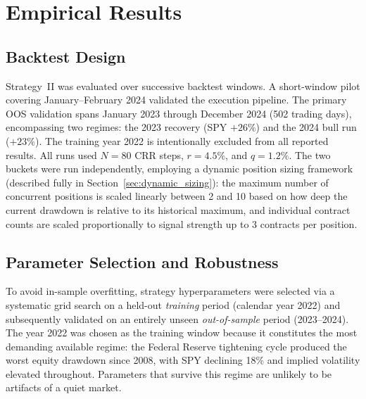 \documentclass[10pt,twocolumn]{article}
\begin{document}
\section{Empirical Results}
\label{sec:results}

\subsection{Backtest Design}

Strategy~II was evaluated over successive backtest windows. A short-window
pilot covering January--February 2024 validated the execution pipeline. The
primary OOS validation spans January 2023 through December 2024 (502 trading
days), encompassing two regimes: the 2023 recovery (SPY $+26\%$) and the
2024 bull run ($+23\%$). The training year 2022 is intentionally excluded
from all reported results.  All runs used $N = 80$ CRR steps, $r = 4.5\%$,
and $q = 1.2\%$. The two buckets were run independently, employing a dynamic position sizing
framework (described fully in Section~\ref{sec:dynamic_sizing}): the maximum
number of concurrent positions is scaled linearly between 2 and 10 based on
how deep the current drawdown is relative to its historical maximum, and
individual contract counts are scaled proportionally to signal strength up to
3 contracts per position.

\subsection{Parameter Selection and Robustness}
\label{sec:params}

To avoid in-sample overfitting, strategy hyperparameters were selected via
a systematic grid search on a held-out \emph{training} period (calendar year
2022) and subsequently validated on an entirely unseen \emph{out-of-sample}
period (2023--2024).  The year 2022 was chosen as the training window because
it constitutes the most demanding available regime: the Federal Reserve
tightening cycle produced the worst equity drawdown since 2008, with SPY
declining 18\% and implied volatility elevated throughout.  Parameters that
survive this regime are unlikely to be artifacts of a quiet market.
\end{document}
